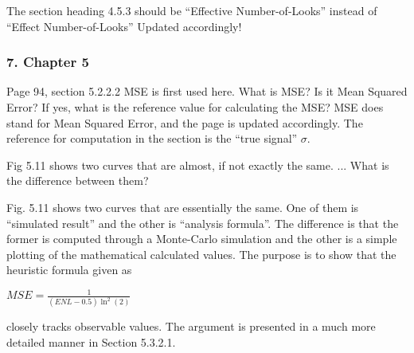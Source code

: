 \replyToComment
    {The section heading 4.5.3 should be ``Effective Number-of-Looks'' instead of ``Effect Number-of-Looks''}
    {Updated accordingly!}

\subsubsection*{7. Chapter 5}

\replyToComment
    {Page 94, section 5.2.2.2 MSE is first used here. What is MSE? Is it Mean Squared Error? If yes, what is the reference value for calculating the MSE?}
    {MSE does stand for Mean Squared Error, and the page is updated accordingly.
The reference for computation in the section is the ``true signal'' $\sigma$.
}

\replyToComment
    {Fig 5.11  shows two curves that are almost, if not exactly the same. ...
What is the difference between them?}
    {Fig. 5.11 shows two curves that are essentially the same.
One of them is ``simulated result'' and the other is ``analysis formula''.
The difference is that the former is computed through a Monte-Carlo simulation and the other is a simple plotting of the mathematical calculated values.
The purpose is to show that the heuristic formula given as

\begin{center}
  $MSE = \frac{1}{(ENL-0.5)\ln^2(2)}$
\end{center}  

closely tracks observable values.
The argument is presented in a much more detailed manner in Section 5.3.2.1.
}

